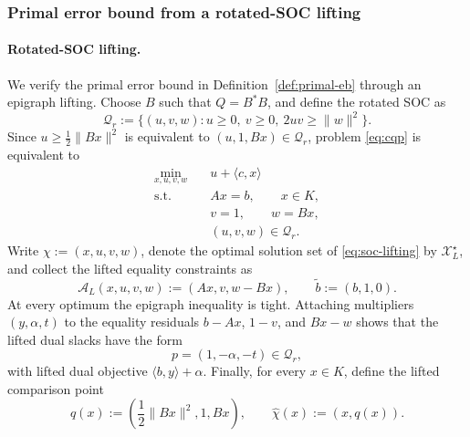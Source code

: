\documentclass[letterpaper]{article} %
\theoremstyle{definition}
\theoremstyle{remark}
\begin{document}
\subsubsection{Primal error bound from a rotated-SOC lifting}

\paragraph{Rotated-SOC lifting.}
We verify the primal error bound in Definition~\ref{def:primal-eb} through an
epigraph lifting.  Choose $B$ such that $Q=B^*B$, and define the rotated SOC as 
\[
    \mathcal Q_r
    :=
    \{(u,v,w):u\ge0,\ v\ge0,\ 2uv\ge\|w\|^2\}.
\]
Since $u\ge\frac12\|Bx\|^2$ is equivalent to $(u,1,Bx)\in\mathcal Q_r$,
problem \eqref{eq:cqp} is equivalent to
\begin{equation}
\label{eq:soc-lifting}
\begin{aligned}
    \min_{x,u,v,w}\quad
        &u+\langle c,x\rangle\\
    \mathrm{s.t.}\quad
        &Ax=b,\qquad x\in K,\\
        &v=1,\qquad w=Bx,\\
        &(u,v,w)\in\mathcal Q_r.
\end{aligned}
\end{equation}
Write $\chi:=(x,u,v,w)$, denote the optimal solution set of
\eqref{eq:soc-lifting} by $\mathcal X_L^\star$, and collect the lifted
equality constraints as
\[
    \mathcal A_L(x,u,v,w):=(Ax,v,w-Bx),
    \qquad
    \widetilde b:=(b,1,0).
\]
At every optimum the epigraph inequality is tight.  Attaching multipliers
$(y,\alpha,t)$ to the equality residuals $b-Ax$, $1-v$, and $Bx-w$ shows
that the lifted dual slacks have the form
\[
    p=(1,-\alpha,-t)\in\mathcal Q_r,
\]
with lifted dual objective $\langle b,y\rangle+\alpha$.  Finally, for every
$x\in K$, define the lifted comparison point
\[
    q(x):=\left(\frac12\|Bx\|^2,1,Bx\right),
    \qquad
    \widehat\chi(x):=(x,q(x)).
\]
\end{document}
